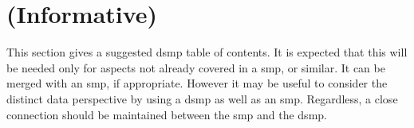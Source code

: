%
%
\section{ (Informative)} \label{bkm:plan}


This section gives a suggested \gls{dsmp} table of contents. It is expected that this will be needed only for aspects not already covered in a \gls{smp}, or similar. It can be merged with an \gls{smp}, if appropriate. However it may be useful to consider the distinct data perspective by using a \gls{dsmp} as well as an \gls{smp}. Regardless, a close connection should be maintained between the \gls{smp} and the \gls{dsmp}.

